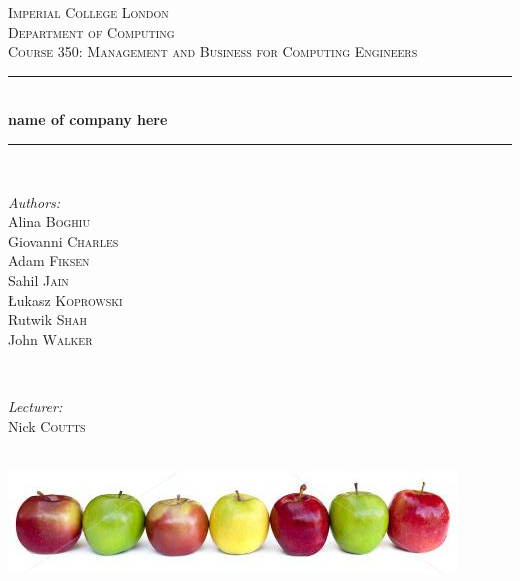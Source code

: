 \documentclass{article}
\begin{document}

\begin{titlepage}
\newcommand{\HRule}{\rule{\linewidth}{0.5mm}}
\center
\textsc{\LARGE Imperial College London}  \\[1.5cm]
\textsc{\Large Department of Computing}  \\[0.5cm]
\textsc{\large Course 350: Management and Business for Computing Engineers} \\[0.5cm]

\HRule \\[0.6cm]
{\huge \bfseries name of company here} \\[0.3cm]
\HRule \\[1.5cm]

\begin{minipage}{0.4\textwidth}

\begin{flushleft} \large \emph{Authors:} \\
Alina     \textsc{Boghiu}    \\
Giovanni  \textsc{Charles}   \\
Adam      \textsc{Fiksen}    \\
Sahil     \textsc{Jain}      \\
\L ukasz  \textsc{Koprowski} \\
Rutwik    \textsc{Shah}      \\
John      \textsc{Walker}    \\
\end{flushleft}

\end{minipage}~
\begin{minipage}{0.4\textwidth}

\begin{flushright} \large \emph{Lecturer:} \\
Nick \textsc{Coutts}
\end{flushright}


\end{minipage}\\[4cm]

\includegraphics[width=\textwidth]{apples.jpg}

\end{titlepage}
\end{document}
